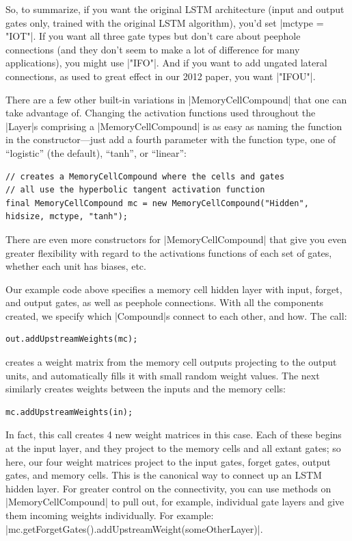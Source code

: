 \documentclass{article}
\begin{document}
So, to summarize, if you want the original LSTM architecture (input and output gates only, trained
with the original LSTM algorithm), you'd set  |mctype = "IOT"|. If you want all three gate types but don't care about peephole 
connections (and they don't seem to make a lot of difference for many applications), you might use 
 |"IFO"|. And if you want to add ungated lateral connections, as used to great effect in our 2012 paper, you 
want  |"IFOU"|.

There are a few other built-in variations in |MemoryCellCompound| that one can take advantage of. Changing the activation functions used throughout the |Layer|s comprising a |MemoryCellCompound| is as easy as naming the function in the constructor---just add a fourth parameter with the function type, one of ``logistic'' (the default), ``tanh'', or ``linear'':

\begin{verbatim}
// creates a MemoryCellCompound where the cells and gates
// all use the hyperbolic tangent activation function
final MemoryCellCompound mc = new MemoryCellCompound("Hidden", hidsize, mctype, "tanh");
\end{verbatim}

There are even more constructors for |MemoryCellCompound| that give you even greater flexibility with regard to the activations functions of each set of gates, whether each unit has biases, etc.

Our example code above specifies a memory cell hidden layer with input, forget, and output gates, as
well as peephole connections. With all the components created, we specify which |Compound|s connect
to each other, and how. The call:
\begin{verbatim}
out.addUpstreamWeights(mc);
\end{verbatim}
creates a weight matrix from the memory cell outputs projecting to the output units, and
automatically fills it with small random weight values. The next similarly creates weights between the inputs and the memory cells:
\begin{verbatim}
mc.addUpstreamWeights(in);
\end{verbatim}
In fact, this call creates 4 new weight matrices in this
case. Each of these begins at the input layer, and they project to the memory cells and all extant gates; so here, our four weight matrices project to the input gates, forget gates,
output gates, and memory cells. This is the canonical way to connect up an LSTM hidden layer. For greater control on the connectivity, you can use methods on |MemoryCellCompound| to pull out, for example, individual gate layers and give them incoming weights individually. For example: |mc.getForgetGates().addUpstreamWeight(someOtherLayer)|.
\end{document}
